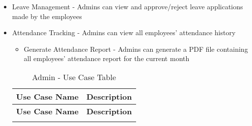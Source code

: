 \documentclass{icsthesis}
\begin{document}
\begin{mainmatter}
\begin{itemize}
\begin{itemize}
    \end{itemize}
    \item Leave Management - Admins can view and approve/reject leave applications made by the employees
    \item Attendance Tracking - Admins can view all employees' attendance history
    \begin{itemize}
        \item Generate Attendance Report - Admins can generate a PDF file containing all employees' attendance report for the current month
    \end{itemize}
\renewcommand{\arraystretch}{1.3} %
\begin{longtable}{|p{}|p{}|}
\caption{Admin - Use Case Table} \label{tab:admin-usecase} \\
\hline
\textbf{Use Case Name} & \textbf{Description} \\
\hline
\endfirsthead

\hline
\textbf{Use Case Name} & \textbf{Description} \\
\hline
\endhead

\hline
\endfoot

\hline
\endlastfoot


\end{longtable}
\end{itemize}
\end{mainmatter}
\end{document}
